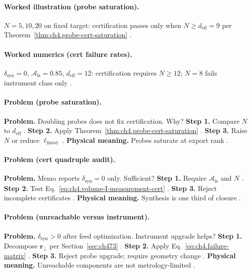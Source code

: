 \paragraph{Worked illustration (probe saturation).}
\(N=5,10,20\) on fixed target: certification passes only when \(N\ge d_{\mathrm{eff}}=9\) per Theorem~\ref{thm:ch4.probe-cert-saturation}
\cite{harrington2001,hansen1988,devaney2004,stratton1941,jackson1999}.

\paragraph{Worked numerics (cert failure rates).}
\(\delta_{\mathrm{syn}}=0\), \(\mathcal{A}_{\mathrm{fs}}=0.85\), \(d_{\mathrm{eff}}=12\): certification requires \(N\ge12\); \(N=8\) fails instrument class only
\cite{harrington2001,stratton1941,hansen1988,devaney2004,collin2001}.

\paragraph{Problem (probe saturation).}
\textbf{Problem.} Doubling probes does not fix certification. Why?
\textbf{Step 1.} Compare \(N\) to \(d_{\mathrm{eff}}\) \cite{harrington2001,hansen1988}.
\textbf{Step 2.} Apply Theorem~\ref{thm:ch4.probe-cert-saturation} \cite{devaney2004,stratton1941}.
\textbf{Step 3.} Raise \(N\) or reduce \(\ell_{\mathrm{listed}}\) \cite{jackson1999,collin2001}.
\textbf{Physical meaning.} Probes saturate at export rank \cite{harrington2001}.

\paragraph{Problem (cert quadruple audit).}
\textbf{Problem.} Memo reports \(\delta_{\mathrm{syn}}=0\) only. Sufficient?
\textbf{Step 1.} Require \(\mathcal{A}_{\mathrm{fs}}\) and \(N\) \cite{hansen1988,stratton1941}.
\textbf{Step 2.} Test Eq.~\eqref{eq:ch4.volume-I-measurement-cert} \cite{harrington2001,devaney2004}.
\textbf{Step 3.} Reject incomplete certificates \cite{jackson1999,collin2001}.
\textbf{Physical meaning.} Synthesis is one third of closure \cite{stratton1941}.

\paragraph{Problem (unreachable versus instrument).}
\textbf{Problem.} \(\delta_{\mathrm{syn}}>0\) after feed optimization. Instrument upgrade helps?
\textbf{Step 1.} Decompose \(\mathbf{r}_{\perp}\) per Section~\ref{sec:ch473} \cite{harrington2001,stratton1941}.
\textbf{Step 2.} Apply Eq.~\eqref{eq:ch4.failure-matrix} \cite{devaney2004,hansen1988}.
\textbf{Step 3.} Reject probe upgrade; require geometry change \cite{jackson1999,stratton1941}.
\textbf{Physical meaning.} Unreachable components are not metrology-limited \cite{harrington2001,collin2001}.

